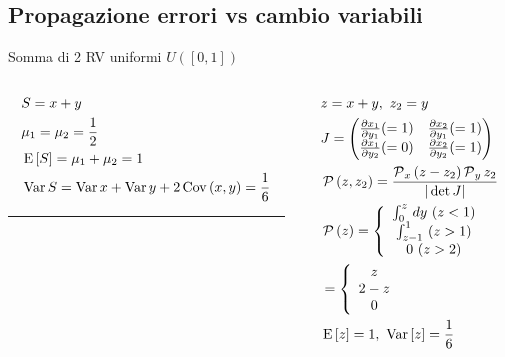 \subsection{Propagazione errori vs cambio variabili}

\begin{wordonframe}{Somma di 2 RV uniformi $U([0,1])$}
\begin{columns}[T]
\begin{column}{0.5\textwidth}
\begin{align*}
&S=x+y\\
&\mu_1=\mu_2=\frac{1}{2}\\
&\E{[S]}=\mu_1+\mu_2=1\\
&\var{S}=\var{x}+\var{y}+2\cov{(x,y)}=\frac{1}{6}
\end{align*}
\noindent\rule{0.9\textwidth}{0.4pt}
\end{column}
\begin{column}{0.5\textwidth}
\begin{align*}
&z=x+y,\ z_2=y\\
&J=\begin{pmatrix}
\PDy{y_1}{x_1}(=1)&\PDy{y_1}{x_2}(=1)\\
\PDy{y_2}{x_1}(=0)&\PDy{y_2}{x_2}(=1)\\
\end{pmatrix}\\
&\prob{(z,z_2)}=\frac{\prob_x{(z-z_2)}\prob_y{z_2}}{|\det{J}|}\\
&\prob{(z)}=\left\{\begin{array}{c}
\int_0^z\,dy\ (z<1)\\
\int_{z-1}^1\ (z>1)\\
0\ (z>2)\\
\end{array}\right.\\
&=\left\{\begin{array}{c}
z\\
2-z\\
0\\
\end{array}\right.\\
&\E{[z]}=1,\ \var{[z]}=\frac{1}{6}
\end{align*}
\end{column}
\end{columns}
\end{wordonframe}

